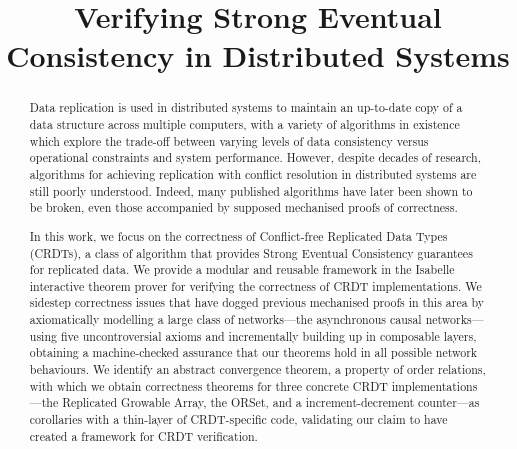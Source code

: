 \documentclass[acmlarge,review,anonymous]{acmart}\settopmatter{printfolios=true}
\begin{document}
\title{Verifying Strong Eventual Consistency in Distributed Systems}

\begin{abstract}
Data replication is used in distributed systems to maintain an up-to-date copy of a data structure across multiple computers, with a variety of algorithms in existence which explore the trade-off between varying levels of data consistency versus operational constraints and system performance.
However, despite decades of research, algorithms for achieving replication with conflict resolution in distributed systems are still poorly understood.
Indeed, many published algorithms have later been shown to be broken, even those accompanied by supposed mechanised proofs of correctness.

In this work, we focus on the correctness of Conflict-free Replicated Data Types (CRDTs), a class of algorithm that provides Strong Eventual Consistency guarantees for replicated data.
We provide a modular and reusable framework in the Isabelle interactive theorem prover for verifying the correctness of CRDT implementations.
We sidestep correctness issues that have dogged previous mechanised proofs in this area by axiomatically modelling a large class of networks---the asynchronous causal networks---using five uncontroversial axioms and incrementally building up in composable layers, obtaining a machine-checked assurance that our theorems hold in all possible network behaviours.
We identify an abstract convergence theorem, a property of order relations, with which we obtain correctness theorems for three concrete CRDT implementations---the Replicated Growable Array, the ORSet, and a increment-decrement counter---as corollaries with a thin-layer of CRDT-specific code, validating our claim to have created a framework for CRDT verification.
\end{abstract}
\end{document}

